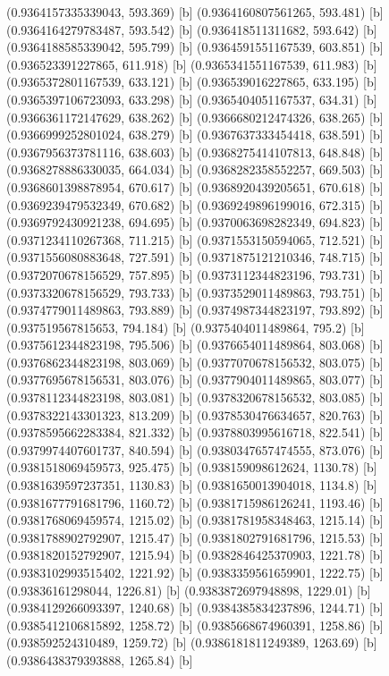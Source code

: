 {{{(0.9364157335339043, 593.369) [b] 
(0.9364160807561265, 593.481) [b] 
(0.9364164279783487, 593.542) [b] 
(0.936418511311682, 593.642) [b] 
(0.9364188585339042, 595.799) [b] 
(0.9364591551167539, 603.851) [b] 
(0.936523391227865, 611.918) [b] 
(0.9365341551167539, 611.983) [b] 
(0.9365372801167539, 633.121) [b] 
(0.936539016227865, 633.195) [b] 
(0.9365397106723093, 633.298) [b] 
(0.9365404051167537, 634.31) [b] 
(0.9366361172147629, 638.262) [b] 
(0.9366680212474326, 638.265) [b] 
(0.9366999252801024, 638.279) [b] 
(0.9367637333454418, 638.591) [b] 
(0.9367956373781116, 638.603) [b] 
(0.9368275414107813, 648.848) [b] 
(0.9368278886330035, 664.034) [b] 
(0.9368282358552257, 669.503) [b] 
(0.9368601398878954, 670.617) [b] 
(0.9368920439205651, 670.618) [b] 
(0.9369239479532349, 670.682) [b] 
(0.9369249896199016, 672.315) [b] 
(0.9369792430921238, 694.695) [b] 
(0.9370063698282349, 694.823) [b] 
(0.9371234110267368, 711.215) [b] 
(0.9371553150594065, 712.521) [b] 
(0.9371556080883648, 727.591) [b] 
(0.9371875121210346, 748.715) [b] 
(0.9372070678156529, 757.895) [b] 
(0.9373112344823196, 793.731) [b] 
(0.9373320678156529, 793.733) [b] 
(0.9373529011489863, 793.751) [b] 
(0.9374779011489863, 793.889) [b] 
(0.9374987344823197, 793.892) [b] 
(0.937519567815653, 794.184) [b] 
(0.9375404011489864, 795.2) [b] 
(0.9375612344823198, 795.506) [b] 
(0.9376654011489864, 803.068) [b] 
(0.9376862344823198, 803.069) [b] 
(0.9377070678156532, 803.075) [b] 
(0.9377695678156531, 803.076) [b] 
(0.9377904011489865, 803.077) [b] 
(0.9378112344823198, 803.081) [b] 
(0.9378320678156532, 803.085) [b] 
(0.9378322143301323, 813.209) [b] 
(0.9378530476634657, 820.763) [b] 
(0.9378595662283384, 821.332) [b] 
(0.9378803995616718, 822.541) [b] 
(0.9379974407601737, 840.594) [b] 
(0.9380347657474555, 873.076) [b] 
(0.9381518069459573, 925.475) [b] 
(0.938159098612624, 1130.78) [b] 
(0.9381639597237351, 1130.83) [b] 
(0.9381650013904018, 1134.8) [b] 
(0.9381677791681796, 1160.72) [b] 
(0.9381715986126241, 1193.46) [b] 
(0.9381768069459574, 1215.02) [b] 
(0.9381781958348463, 1215.14) [b] 
(0.9381788902792907, 1215.47) [b] 
(0.9381802791681796, 1215.53) [b] 
(0.9381820152792907, 1215.94) [b] 
(0.9382846425370903, 1221.78) [b] 
(0.9383102993515402, 1221.92) [b] 
(0.9383359561659901, 1222.75) [b] 
(0.93836161298044, 1226.81) [b] 
(0.9383872697948898, 1229.01) [b] 
(0.9384129266093397, 1240.68) [b] 
(0.9384385834237896, 1244.71) [b] 
(0.9385412106815892, 1258.72) [b] 
(0.9385668674960391, 1258.86) [b] 
(0.938592524310489, 1259.72) [b] 
(0.9386181811249389, 1263.69) [b] 
(0.9386438379393888, 1265.84) [b] 
}}}
